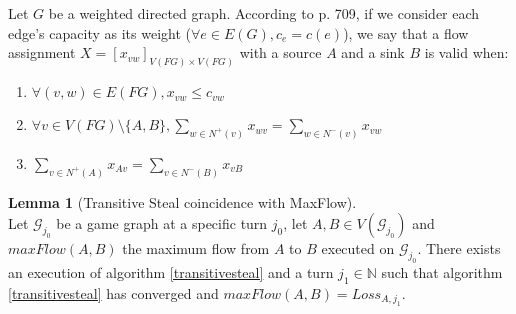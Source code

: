 \documentclass[11pt]{article}
\theoremstyle{definition}
\theoremstyle{corollary}
\theoremstyle{lemma}
\newtheorem{lemma}{Lemma}[section]
\begin{document}
    Let $G$ be a weighted directed graph. According to \cite{clrs} p. 709, if we consider each edge's capacity as its weight
    ($\forall e \in E(G), c_e = c(e)$), we say that a flow assignment $X = [x_{vw}]_{V(FG) \times V(FG)}$ with a source $A$
    and a sink $B$ is valid when:
    \begin{enumerate}
       \item $\forall (v, w) \in E(FG), x_{vw} \leq c_{vw}$
       \item $\forall v \in V(FG) \setminus \{A,B\}, \sum\limits_{w \in N^{+}(v)}x_{wv} = \sum\limits_{w \in N^{-}(v)}x_{vw}$
       \item $\sum\limits_{v \in N^{+}(A)}x_{Av} = \sum\limits_{v \in N^{-}(B)}x_{vB}$
    \end{enumerate}
    \begin{lemma}[Transitive Steal coincidence with MaxFlow] \ \\
       \label{maxflowvalidgame}
       Let $\mathcal{G}_{j_0}$ be a game graph at a specific turn $j_0$, let $A, B \in V(\mathcal{G}_{j_0})$ and
       $maxFlow(A, B)$ the maximum flow from $A$ to $B$ executed on $\mathcal{G}_{j_0}$. There exists an execution of
       algorithm \ref{transitivesteal} and a turn $j_1 \in \mathbb{N}$ such that algorithm \ref{transitivesteal} has
       converged and $maxFlow(A, B) = Loss_{A, j_1}$.
    \end{lemma}
\end{document}
